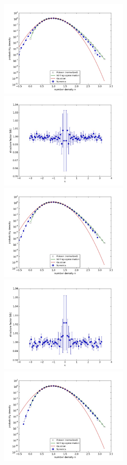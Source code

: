 \documentclass{article}
\begin{document}
\begin{figure}
\begin{center}
\end{center}
\includegraphics[width=0.5\linewidth,height=1.9in]{fig1/diff_dt1_hist_mid1.jpg}
\includegraphics[width=0.5\linewidth,height=1.9in]{fig1/diff_dt1_Sk_mid1.jpg}
\includegraphics[width=0.5\linewidth,height=1.9in]{fig1/diff_dt1_hist_mid2.jpg}
\includegraphics[width=0.5\linewidth,height=1.9in]{fig1/diff_dt1_Sk_mid2.jpg}
\includegraphics[width=0.5\linewidth,height=1.9in]{fig1/diff_dt1_hist_mid3.jpg}

\end{figure}
\end{document}
